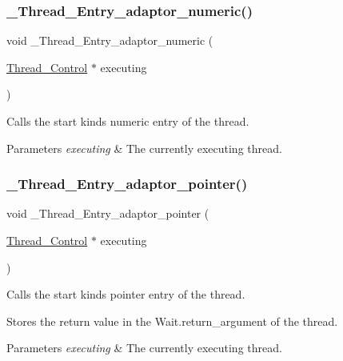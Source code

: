 \subsubsection{\texorpdfstring{\_Thread\_Entry\_adaptor\_numeric()}{\_Thread\_Entry\_adaptor\_numeric()}}
{\footnotesize\ttfamily void \+\_\+\+Thread\+\_\+\+Entry\+\_\+adaptor\+\_\+numeric (\begin{DoxyParamCaption}\item[{\mbox{\hyperlink{struct__Thread__Control}{Thread\+\_\+\+Control}} $\ast$}]{executing }\end{DoxyParamCaption})}



Calls the start kinds numeric entry of the thread. 


\begin{DoxyParams}{Parameters}
{\em executing} & The currently executing thread. \\
\hline
\end{DoxyParams}
\mbox{\label{group__RTEMSScoreThread_gaac2283a605738e5b3fd2e1710ea8b73a}} 
\subsubsection{\texorpdfstring{\_Thread\_Entry\_adaptor\_pointer()}{\_Thread\_Entry\_adaptor\_pointer()}}
{\footnotesize\ttfamily void \+\_\+\+Thread\+\_\+\+Entry\+\_\+adaptor\+\_\+pointer (\begin{DoxyParamCaption}\item[{\mbox{\hyperlink{struct__Thread__Control}{Thread\+\_\+\+Control}} $\ast$}]{executing }\end{DoxyParamCaption})}



Calls the start kinds pointer entry of the thread. 

Stores the return value in the Wait.\+return\+\_\+argument of the thread.


\begin{DoxyParams}{Parameters}
{\em executing} & The currently executing thread. \\
\hline
\end{DoxyParams}
\mbox{\label{group__RTEMSScoreThread_ga99bebb00c256fb08bd5c1bdf546c5e1f}} 
